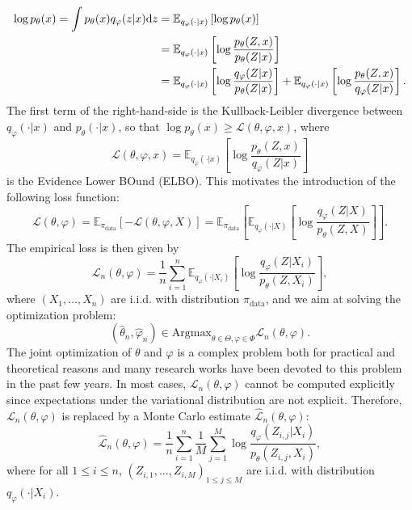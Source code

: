 \documentclass[english,graybox,envcountchap,envcountsame,sectrefs,shortlabels]{svmono}
\theoremstyle{style}
\newcommand{\eqsp}{}
\begin{document}
\begin{align*}
\log p_\theta(x) = \int p_\theta(x) q_{\varphi}(z|x) \mathrm{d} z &= \mathbb{E}_{q_{\varphi}(\cdot|x)}\left[\log p_\theta(x)\right] \\
&= \mathbb{E}_{q_{\varphi}(\cdot|x)}\left[\log \frac{p_\theta(Z,x)}{p_\theta(Z|x)}\right] \\
&= \mathbb{E}_{q_{\varphi}(\cdot|x)}\left[\log \frac{q_{\varphi}(Z|x)}{p_\theta(Z|x)}\right]  + \mathbb{E}_{q_{\varphi}(\cdot|x)}\left[\log \frac{p_\theta(Z,x)}{q_{\varphi}(Z|x)}\right] .
\end{align*}
The first term of the right-hand-side is the Kullback-Leibler divergence between $q_{\varphi}(\cdot|x)$ and $p_\theta(\cdot|x)$, so that $\log p_\theta(x)\geq \mathcal{L}(\theta,\varphi,x)$, where
$$
\mathcal{L}(\theta,\varphi,x) = \mathbb{E}_{q_{\varphi}(\cdot|x)}\left[\log \frac{p_\theta(Z,x)}{q_{\varphi}(Z|x)}\right]
$$
is the Evidence Lower BOund (ELBO). 
This motivates the introduction of the following loss function:
$$
\mathcal{L}(\theta,\varphi) = \mathbb{E}_{\pi_{\mathrm{data}}}[-\mathcal{L}(\theta,\varphi,X)] = \mathbb{E}_{\pi_{\mathrm{data}}}\left[\mathbb{E}_{q_{\varphi}(\cdot|X)}\left[\log \frac{q_{\varphi}(Z|X)}{p_\theta(Z,X)}\right]\right]\eqsp.
$$
The empirical loss is then given by
$$
\mathcal{L}_n(\theta,\varphi) = \frac{1}{n}\sum_{i=1}^n\mathbb{E}_{q_{\varphi}(\cdot|X_i)}\left[\log \frac{q_{\varphi}(Z|X_i)}{p_\theta(Z,X_i)}\right]\eqsp,
$$
where $(X_1,\ldots,X_n)$ are i.i.d. with distribution $\pi_{\mathrm{data}}$, and we aim at solving the optimization problem:
\begin{equation}
\label{eq:optim:ELBO}
(\widehat \theta_n,\widehat \varphi_n) \in \mathrm{Argmax}_{\theta\in\Theta,\varphi\in\Phi}\eqsp \mathcal{L}_n(\theta,\varphi) \eqsp.
\end{equation}
The joint optimization of $\theta$ and $\varphi$ is a complex problem both for practical and theoretical reasons and many research works have been devoted to this problem in the past few years. In most cases, $\mathcal{L}_n(\theta,\varphi)$ cannot be computed explicitly since expectations under the variational distribution are not explicit. Therefore, $\mathcal{L}_n(\theta,\varphi) $ is replaced by a Monte Carlo estimate $\widehat{\mathcal{L}}_n(\theta,\varphi)$:
$$
\widehat{\mathcal{L}}_n(\theta,\varphi) =  \frac{1}{n}\sum_{i=1}^n\frac{1}{M}\sum_{j=1}^M\log \frac{q_{\varphi}(Z_{i,j}|X_i)}{p_\theta(Z_{i,j},X_i)}\eqsp,
$$ 
where for all $1\leqslant i \leqslant n$, $(Z_{i,1},\ldots,Z_{i,M})_{1\leqslant j\leqslant M}$ are i.i.d. with distribution $q_{\varphi}(\cdot|X_i)$.
\end{document}
